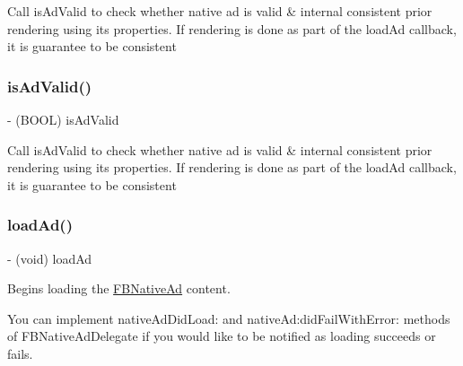 Call is\+Ad\+Valid to check whether native ad is valid \& internal consistent prior rendering using its properties. If rendering is done as part of the load\+Ad callback, it is guarantee to be consistent \mbox{\label{interfaceFBNativeAd_ab7ac5c53be873134d4ad5082e542754d}} 
\subsubsection{\texorpdfstring{is\+Ad\+Valid()}{isAdValid()}\hspace{0.1cm}{\footnotesize\ttfamily [5/5]}}
{\footnotesize\ttfamily -\/ (B\+O\+OL) is\+Ad\+Valid \begin{DoxyParamCaption}{ }\end{DoxyParamCaption}}

Call is\+Ad\+Valid to check whether native ad is valid \& internal consistent prior rendering using its properties. If rendering is done as part of the load\+Ad callback, it is guarantee to be consistent \mbox{\label{interfaceFBNativeAd_a943433e6b6c4e4a3d3868203642cda15}} 
\subsubsection{\texorpdfstring{load\+Ad()}{loadAd()}\hspace{0.1cm}{\footnotesize\ttfamily [1/5]}}
{\footnotesize\ttfamily -\/ (void) load\+Ad \begin{DoxyParamCaption}{ }\end{DoxyParamCaption}}

Begins loading the \hyperlink{interfaceFBNativeAd}{F\+B\+Native\+Ad} content.

You can implement {\ttfamily native\+Ad\+Did\+Load\+:} and {\ttfamily native\+Ad\+:did\+Fail\+With\+Error\+:} methods of {\ttfamily F\+B\+Native\+Ad\+Delegate} if you would like to be notified as loading succeeds or fails. \mbox{\label{interfaceFBNativeAd_a943433e6b6c4e4a3d3868203642cda15}} 
